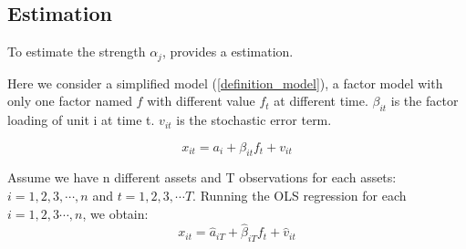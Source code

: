 \documentclass[12pt]{article}
\begin{document}



	\subsection{Estimation}\label{estimation}
To estimate the strength $\alpha_j$,  provides a estimation.

Here we consider a simplified model (\ref{definition_model}), a factor model with only one factor named $f$ with different value $f_t$ at different time. 
 $\beta_{it}$ is the factor loading of unit i at time t.
$v_{it}$ is the stochastic error term.

\[  x_{it} = a_{i} +  \beta_{it}f_{t} + v_{it} \tag{2} \label{estimation_model}\]

Assume we have n different assets and T observations for each assets: $i = 1, 2, 3, \cdots, n$ and $t = 1,2,3, \cdots T$.
Running the OLS regression for each $i = 1,2,3\cdots, n$, we obtain:
\[   x_{it} = \hat{a}_{iT} +  \hat{\beta}_{iT}f_{t} + \hat{v}_{it}  \]
\end{document}
